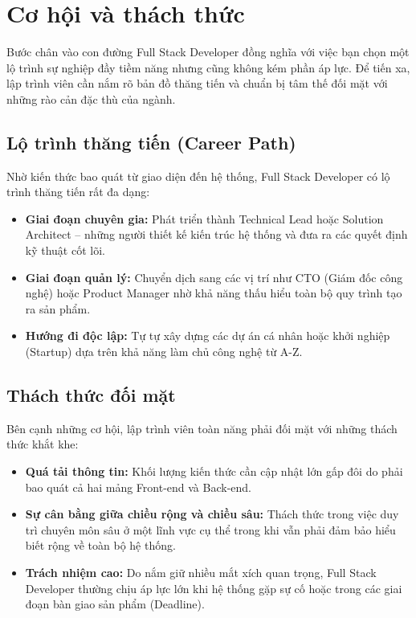 \documentclass[12pt,a4paper]{article}
\begin{document}
\section{Cơ hội và thách thức}

\hspace{0.7cm}Bước chân vào con đường Full Stack Developer đồng nghĩa với việc bạn chọn một lộ trình sự nghiệp đầy tiềm năng nhưng cũng không kém phần áp lực. Để tiến xa, lập trình viên cần nắm rõ bản đồ thăng tiến và chuẩn bị tâm thế đối mặt với những rào cản đặc thù của ngành.

\subsection{Lộ trình thăng tiến (Career Path)}
Nhờ kiến thức bao quát từ giao diện đến hệ thống, Full Stack Developer có lộ trình thăng tiến rất đa dạng:
\begin{itemize}
    \item \textbf{Giai đoạn chuyên gia:} Phát triển thành Technical Lead hoặc Solution Architect – những người thiết kế kiến trúc hệ thống và đưa ra các quyết định kỹ thuật cốt lõi.
    \item \textbf{Giai đoạn quản lý:} Chuyển dịch sang các vị trí như CTO (Giám đốc công nghệ) hoặc Product Manager nhờ khả năng thấu hiểu toàn bộ quy trình tạo ra sản phẩm.
    \item \textbf{Hướng đi độc lập:} Tự tự xây dựng các dự án cá nhân hoặc khởi nghiệp (Startup) dựa trên khả năng làm chủ công nghệ từ A-Z.
\end{itemize}

\subsection{Thách thức đối mặt}
\hspace{0.7cm}Bên cạnh những cơ hội, lập trình viên toàn năng phải đối mặt với những thách thức khắt khe:
\begin{itemize}
    \item \textbf{Quá tải thông tin:} Khối lượng kiến thức cần cập nhật lớn gấp đôi do phải bao quát cả hai mảng Front-end và Back-end.
    \item \textbf{Sự cân bằng giữa chiều rộng và chiều sâu:} Thách thức trong việc duy trì chuyên môn sâu ở một lĩnh vực cụ thể trong khi vẫn phải đảm bảo hiểu biết rộng về toàn bộ hệ thống.
    \item \textbf{Trách nhiệm cao:} Do nắm giữ nhiều mắt xích quan trọng, Full Stack Developer thường chịu áp lực lớn khi hệ thống gặp sự cố hoặc trong các giai đoạn bàn giao sản phẩm (Deadline).
\end{itemize}
\end{document}
